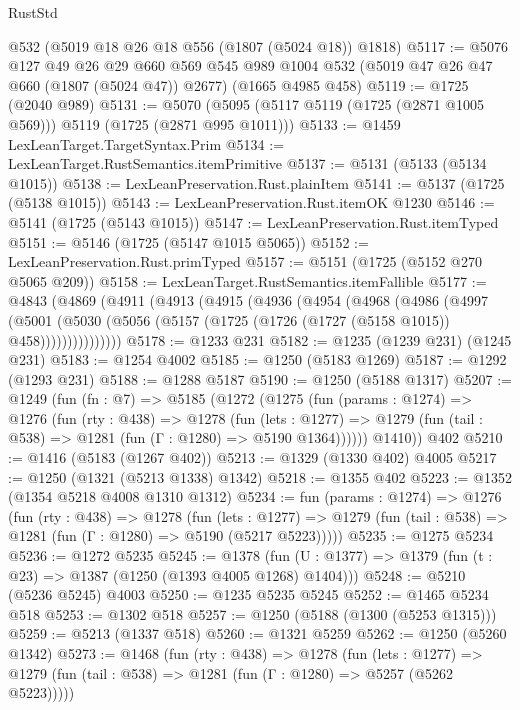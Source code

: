\begin{lexlean}{RustStd}
\begin{coremodule}
    @532
    (@5019 @18 @26 @18 @556 (@1807 (@5024 @18)) @1818)
@5117 := @5076
    @127
    @49
    @26
    @29
    @660
    @569
    @545
    @989
    @1004
    @532
    (@5019 @47 @26 @47 @660 (@1807 (@5024 @47)) @2677)
    (@1665 @4985 @458)
@5119 := @1725 (@2040 @989)
@5131 := @5070 (@5095 (@5117 @5119 (@1725 (@2871 @1005 @569))) @5119 (@1725 (@2871 @995 @1011)))
@5133 := @1459 LexLeanTarget.TargetSyntax.Prim
@5134 := LexLeanTarget.RustSemantics.itemPrimitive
@5137 := @5131 (@5133 (@5134 @1015))
@5138 := LexLeanPreservation.Rust.plainItem
@5141 := @5137 (@1725 (@5138 @1015))
@5143 := LexLeanPreservation.Rust.itemOK @1230
@5146 := @5141 (@1725 (@5143 @1015))
@5147 := LexLeanPreservation.Rust.itemTyped
@5151 := @5146 (@1725 (@5147 @1015 @5065))
@5152 := LexLeanPreservation.Rust.primTyped
@5157 := @5151 (@1725 (@5152 @270 @5065 @209))
@5158 := LexLeanTarget.RustSemantics.itemFallible
@5177 := @4843
    (@4869
      (@4911
        (@4913
          (@4915
            (@4936
              (@4954
                (@4968
                  (@4986
                    (@4997
                      (@5001
                        (@5030 (@5056 (@5157 (@1725 (@1726 (@1727 (@5158 @1015)) @458)))))))))))))))
@5178 := @1233 @231
@5182 := @1235 (@1239 @231) (@1245 @231)
@5183 := @1254 @4002
@5185 := @1250 (@5183 @1269)
@5187 := @1292 (@1293 @231)
@5188 := @1288 @5187
@5190 := @1250 (@5188 @1317)
@5207 := @1249
    (fun (fn : @7) =>
    @5185
      (@1272
        (@1275
          (fun (params : @1274) =>
          @1276
            (fun (rty : @438) =>
            @1278
              (fun (lets : @1277) =>
              @1279 (fun (tail : @538) => @1281 (fun (Γ : @1280) => @5190 @1364))))))
        @1410))
    @402
@5210 := @1416 (@5183 (@1267 @402))
@5213 := @1329 (@1330 @402) @4005
@5217 := @1250 (@1321 (@5213 @1338) @1342)
@5218 := @1355 @402
@5223 := @1352 (@1354 @5218 @4008 @1310 @1312)
@5234 := fun (params : @1274) =>
  @1276
    (fun (rty : @438) =>
    @1278
      (fun (lets : @1277) =>
      @1279 (fun (tail : @538) => @1281 (fun (Γ : @1280) => @5190 (@5217 @5223)))))
@5235 := @1275 @5234
@5236 := @1272 @5235
@5245 := @1378 (fun (U : @1377) => @1379 (fun (t : @23) => @1387 (@1250 (@1393 @4005 @1268) @1404)))
@5248 := @5210 (@5236 @5245) @4003
@5250 := @1235 @5235 @5245
@5252 := @1465 @5234 @518
@5253 := @1302 @518
@5257 := @1250 (@5188 (@1300 (@5253 @1315)))
@5259 := @5213 (@1337 @518)
@5260 := @1321 @5259
@5262 := @1250 (@5260 @1342)
@5273 := @1468
    (fun (rty : @438) =>
    @1278
      (fun (lets : @1277) =>
      @1279 (fun (tail : @538) => @1281 (fun (Γ : @1280) => @5257 (@5262 @5223)))))

\end{coremodule}
\end{lexlean}
